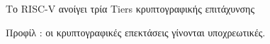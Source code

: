 \begin{frame}{Το RISC-V ανοίγει τρία Tiers κρυπτογραφικής επιτάχυνσης}
  \vspace{0.4em}
  \begin{center}
    \resizebox{0.92\linewidth}{!}{}
  \end{center}
  \vspace{0.2em}
  {\footnotesize Προφίλ : οι κρυπτογραφικές επεκτάσεις γίνονται υποχρεωτικές.}
\end{frame}
